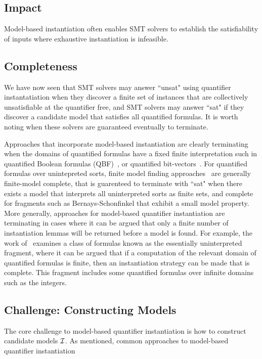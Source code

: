 \documentclass[oribibl]{llncs}
\begin{document}
\subsection{Impact}
Model-based instantiation often enables SMT solvers to
establish the satisfiability of inputs where exhaustive instantiation is infeasible.


\subsection{Completeness}
We have now seen that SMT solvers may answer ``unsat" using quantifier instantatiation
when they discover a finite set of instances that are collectively unsatisfiable at the quantifier free,
and SMT solvers may answer ``sat" if they discover a candidate model that satisfies all quantified formulas.
It is worth noting when these solvers are guaranteed eventually to terminate.

Approaches that incorporate model-based instantiation are clearly terminating
when the domains of quantified formulas have a fixed finite interpretation
such in quantified Boolean formulas (QBF)~\cite{},
or quantified bit-vectors~\cite{}.
For quantified formulas over unintepreted sorts,
finite model finding approaches~\cite{} are generally finite-model complete,
that is guarenteed to terminate with ``sat" when there exists a model that interprets
all uninterpreted sorts as finite sets, and complete for fragments such as Bernays-Schonfinkel
that exhibit a small model property.
More generally, approaches for model-based quantifier instantiation are terminating in cases
where it can be argued that only a finite number of instantiation lemmas will be returned before 
a model is found.
For example, the work of~\cite{} examines a class of formulas known as the essentially uninterpreted fragment,
where it can be argued that if a computation of the relevant domain of quantified formulas is finite,
then an instantiation strategy can be made that is complete.
This fragment includes some quantified formulas over infinite domains such as the integers.

\subsection{Challenge: Constructing Models}
The core challenge to model-based quantifier instantiation is how to construct candidate models $\mathcal{I}$.
As mentioned, common approaches to model-based quantifier instantiation
\end{document}

